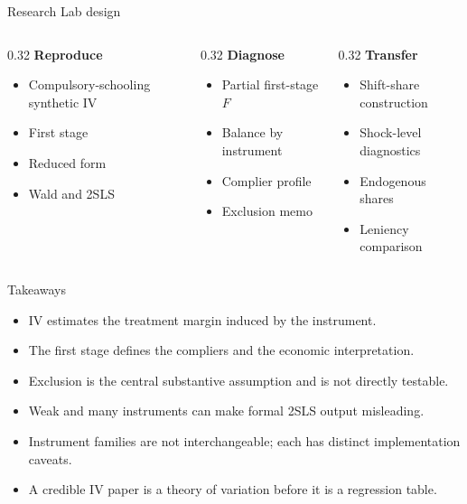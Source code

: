 \documentclass[aspectratio=169,11pt]{beamer}
\newcommand{\1}{\mathbf{1}}
\begin{document}
\begin{frame}{Research Lab design}
\begin{columns}[T,onlytextwidth]
\begin{column}{0.32\linewidth}
\textbf{Reproduce}
\begin{itemize}
    \item Compulsory-schooling synthetic IV
    \item First stage
    \item Reduced form
    \item Wald and 2SLS
\end{itemize}
\end{column}
\begin{column}{0.32\linewidth}
\textbf{Diagnose}
\begin{itemize}
    \item Partial first-stage $F$
    \item Balance by instrument
    \item Complier profile
    \item Exclusion memo
\end{itemize}
\end{column}
\begin{column}{0.32\linewidth}
\textbf{Transfer}
\begin{itemize}
    \item Shift-share construction
    \item Shock-level diagnostics
    \item Endogenous shares
    \item Leniency comparison
\end{itemize}
\end{column}
\end{columns}
\end{frame}

\begin{frame}{Takeaways}
\begin{itemize}
    \item IV estimates the treatment margin induced by the instrument.
    \item The first stage defines the compliers and the economic interpretation.
    \item Exclusion is the central substantive assumption and is not directly testable.
    \item Weak and many instruments can make formal 2SLS output misleading.
    \item Instrument families are not interchangeable; each has distinct implementation caveats.
    \item A credible IV paper is a theory of variation before it is a regression table.
\end{itemize}
\end{frame}
\end{document}
